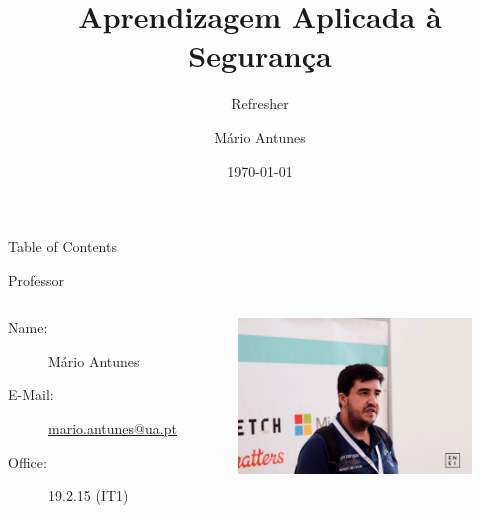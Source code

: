 \documentclass[hyperref={hidelinks}]{beamer}
\title{Aprendizagem Aplicada à Segurança}
\subtitle{Refresher}
\date{\today}
\author{Mário Antunes}
\institute{University of Aveiro}
\begin{document}
  \maketitle

  \begin{frame}{Table of Contents}
    \tableofcontents
  \end{frame}

  \begin{frame}{Professor}
    \begin{columns}
      \begin{description}
        \item[Name:] Mário Antunes
        \item[E-Mail:] \href{mailto:mario.antunes@ua.pt}{\url{mario.antunes@ua.pt}}
        \item[Office:] 19.2.15 (IT1)
      \end{description}
      \begin{figure}
      \centering
      \includegraphics[width=\textwidth]{mantunes}
      \end{figure}
    \end{columns}
  \end{frame}
\end{document}
